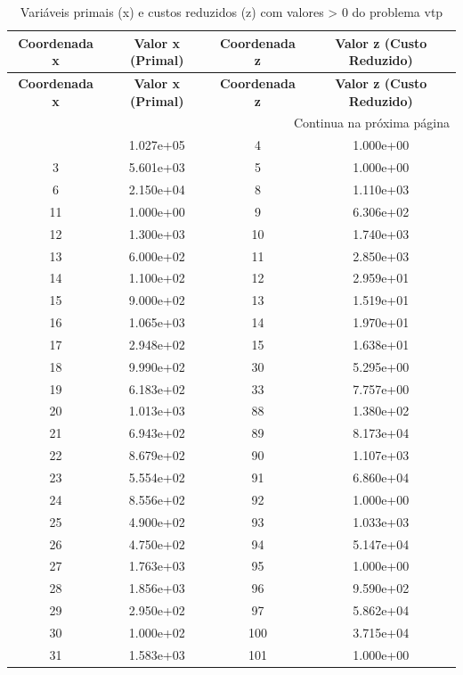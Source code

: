 \documentclass[12pt]{article}
\begin{document}
\begin{longtable}{@{}cccc@{}}
\caption{Variáveis primais (x) e custos reduzidos (z) com valores > 0 do problema vtp} \\
\toprule
\textbf{Coordenada x} & \textbf{Valor x (Primal)} & \textbf{Coordenada z} & \textbf{Valor z (Custo Reduzido)} \\
\midrule
\endfirsthead

\toprule
\textbf{Coordenada x} & \textbf{Valor x (Primal)} & \textbf{Coordenada z} & \textbf{Valor z (Custo Reduzido)} \\
\midrule
\endhead

\midrule \multicolumn{4}{r}{{Continua na próxima página}} \\ \midrule
\endfoot

\bottomrule
\endlastfoot
1 & 1.027e+05 & 4 & 1.000e+00 \\
3 & 5.601e+03 & 5 & 1.000e+00 \\
6 & 2.150e+04 & 8 & 1.110e+03 \\
11 & 1.000e+00 & 9 & 6.306e+02 \\
12 & 1.300e+03 & 10 & 1.740e+03 \\
13 & 6.000e+02 & 11 & 2.850e+03 \\
14 & 1.100e+02 & 12 & 2.959e+01 \\
15 & 9.000e+02 & 13 & 1.519e+01 \\
16 & 1.065e+03 & 14 & 1.970e+01 \\
17 & 2.948e+02 & 15 & 1.638e+01 \\
18 & 9.990e+02 & 30 & 5.295e+00 \\
19 & 6.183e+02 & 33 & 7.757e+00 \\
20 & 1.013e+03 & 88 & 1.380e+02 \\
21 & 6.943e+02 & 89 & 8.173e+04 \\
22 & 8.679e+02 & 90 & 1.107e+03 \\
23 & 5.554e+02 & 91 & 6.860e+04 \\
24 & 8.556e+02 & 92 & 1.000e+00 \\
25 & 4.900e+02 & 93 & 1.033e+03 \\
26 & 4.750e+02 & 94 & 5.147e+04 \\
27 & 1.763e+03 & 95 & 1.000e+00 \\
28 & 1.856e+03 & 96 & 9.590e+02 \\
29 & 2.950e+02 & 97 & 5.862e+04 \\
30 & 1.000e+02 & 100 & 3.715e+04 \\
31 & 1.583e+03 & 101 & 1.000e+00 \\

\end{longtable}
\end{document}

